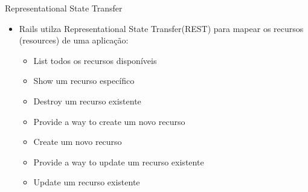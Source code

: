 \begin{frame}[t, fragile]{Representational State Transfer}
	\begin{itemize}
		\item Rails utilza Representational State Transfer(REST) para mapear os recursos (resources)
			de uma aplicação:
		\begin{itemize}
			\item \alert{List} todos os recursos disponíveis
			\item \alert{Show} um recurso específico
			\item \alert{Destroy} um recurso existente
			\item \alert{Provide a way to create} um novo recurso
			\item \alert{Create} um novo recurso
			\item \alert{Provide a way to update} um recurso existente
			\item \alert{Update} um recurso existente
		\end{itemize}		
	\end{itemize}	
\end{frame}